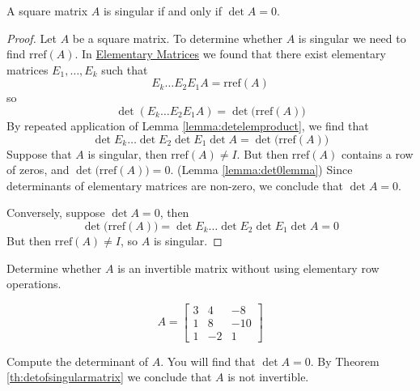 \documentclass{ximera}
\begin{document}
\begin{theorem}\label{th:detofsingularmatrix}
A square matrix $A$ is singular if and only if $\det{A}=0$.
\end{theorem}
\begin{proof}
Let $A$ be a square matrix.  To determine whether $A$ is singular we need to find $\mbox{rref}(A)$.  In \href{https://ximera.osu.edu/linearalgebradzv3/LinearAlgebraInteractiveIntro/MAT-0060/main}{Elementary Matrices} we found that there exist elementary matrices $E_1,\ldots ,E_k$ such that 
$$E_k\ldots E_2E_1A=\mbox{rref}(A)$$
so
$$\det{(E_k\ldots E_2E_1A)}=\det{\big(\mbox{rref}(A)\big)}$$
By repeated application of Lemma \ref{lemma:detelemproduct}, we find that 
$$\det{E_k}\ldots \det{E_2}\det{E_1}\det{A}=\det{\big(\mbox{rref}(A)\big)}$$
Suppose that $A$ is singular, then $\mbox{rref}(A)\neq I$.  But then $\mbox{rref}(A)$ contains a row of zeros, and $\det{\big(\mbox{rref}(A)\big)}=0$. (Lemma \ref{lemma:det0lemma})  Since determinants of elementary matrices are non-zero, we conclude that $\det{A}=0$.

Conversely, suppose $\det{A}=0$, then
$$\det{\big(\mbox{rref}(A)\big)}=\det{E_k}\ldots \det{E_2}\det{E_1}\det{A}=0$$
But then $\mbox{rref}(A)\neq I$, so $A$ is singular.
\end{proof}
\begin{example}\label{ex:invanddet} Determine whether $A$ is an invertible matrix without using elementary row operations.

$$A=\begin{bmatrix}3&4&-8\\1&8&-10\\1&-2&1\end{bmatrix}$$
\begin{explanation}
Compute the determinant of $A$.  You will find that $\det{A}=0$.  By Theorem \ref{th:detofsingularmatrix} we conclude that $A$ is not invertible.
\end{explanation}
\end{example}
\end{document}
